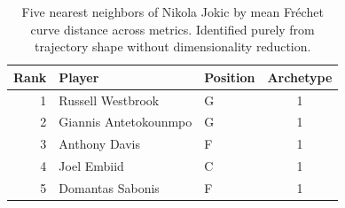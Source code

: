 \begin{table}[htbp]
  \centering\small
  \begin{tabular}{rllc}
    \toprule
    Rank & Player & Position & Archetype \\
    \midrule
    1 & Russell Westbrook & G & 1 \\
    2 & Giannis Antetokounmpo & G & 1 \\
    3 & Anthony Davis & F & 1 \\
    4 & Joel Embiid & C & 1 \\
    5 & Domantas Sabonis & F & 1 \\
    \bottomrule
  \end{tabular}
  \caption{Five nearest neighbors of Nikola Jokic by mean Fr\'{e}chet curve distance across metrics. Identified purely from trajectory shape without dimensionality reduction.}
  \label{tab:Nikola_Jokic_frechet_curve_neighbors}
\end{table}

